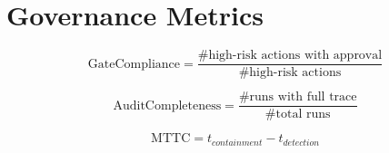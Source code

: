 \section*{Governance Metrics}

\[
\text{GateCompliance}=\frac{\#\text{high-risk actions with approval}}{\#\text{high-risk actions}}
\]

\[
\text{AuditCompleteness}=\frac{\#\text{runs with full trace}}{\#\text{total runs}}
\]

\[
\text{MTTC}=t_{containment}-t_{detection}
\]
